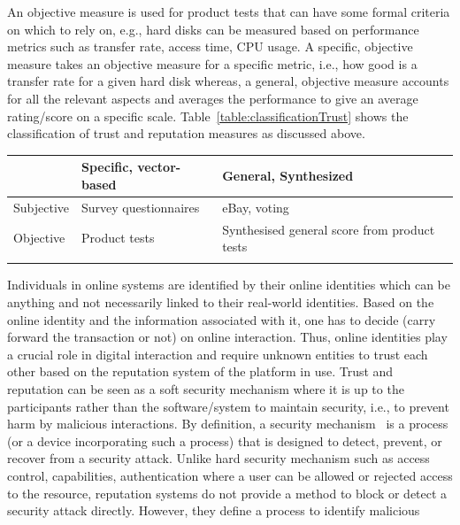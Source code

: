 An objective measure is used for product tests that can have some formal
criteria on which to rely on, e.g., hard disks can be measured based on
performance metrics such as transfer rate, access time, CPU usage. A specific,
objective measure takes an objective measure for a specific metric, i.e., how
good is a transfer rate for a given hard disk whereas, a general, objective
measure accounts for all the relevant aspects and averages the performance to
give an average rating/score on a specific scale.
Table~\ref{table:classificationTrust} shows the classification of trust and
reputation measures as discussed above.  
 \begin{center}\label{table:classificationTrust}
	\begin{tabularx}{\textwidth }{|X| X| X| }
		\hline
		 & Specific, vector-based & General, Synthesized \\
		 \hline
		Subjective & Survey questionnaires & eBay, voting \\
		\hline
		Objective & Product tests & Synthesised general score from product tests \\
		\hline
		\caption{Classification of trust and reputation measures based on ~\cite{josang2007survey}} 
	\end{tabularx}
\end{center}
\vspace{-15mm}
Individuals in online systems are identified by their online identities which
can be anything and not necessarily linked to their real-world identities.
Based on the online identity and the information associated with it, one has to
decide (carry forward the transaction or not) on online interaction. Thus,
online identities play a crucial role in digital interaction and require
unknown entities to trust each other based on the reputation system of the
platform in use. Trust and reputation can be seen as a soft security mechanism
where it is up to the participants rather than the software/system to maintain
security, i.e., to prevent harm by malicious interactions. By definition, a
security mechanism~\cite{stallings2017cryptography} is a process (or a device
incorporating such a process) that is designed to detect, prevent, or recover
from a security attack. Unlike hard security mechanism such as access control,
capabilities, authentication where a user can be allowed or rejected access to
the resource, reputation systems do not provide a method to block or detect a
security attack directly. However, they define a process to identify malicious
